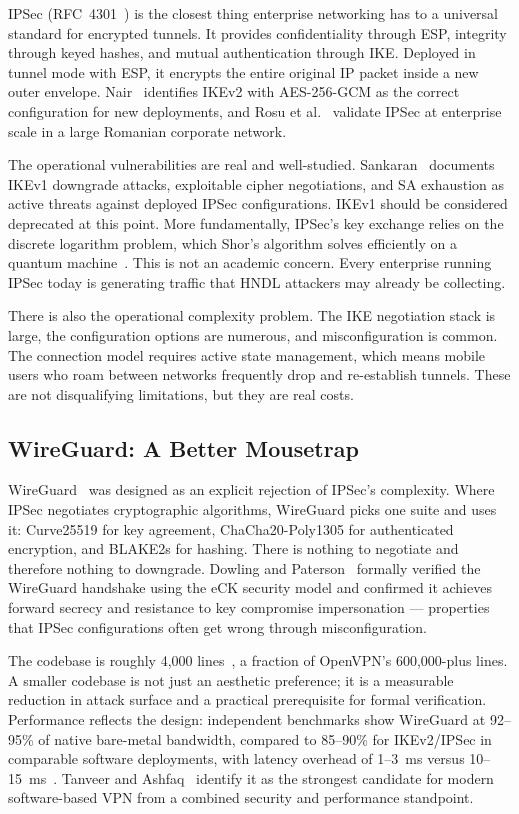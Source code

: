 \documentclass[conference]{IEEEtran}
\begin{document}
IPSec (RFC~4301~\cite{rfc4301}) is the closest thing enterprise
networking has to a universal standard for encrypted tunnels.
It provides confidentiality through ESP, integrity through keyed
hashes, and mutual authentication through IKE. Deployed in
tunnel mode with ESP, it encrypts the entire original IP packet
inside a new outer envelope. Nair~\cite{nair2024} identifies
IKEv2 with AES-256-GCM as the correct configuration for new
deployments, and Rosu et al.~\cite{rosu2012} validate IPSec at
enterprise scale in a large Romanian corporate network.

The operational vulnerabilities are real and well-studied.
Sankaran~\cite{sankaran2023} documents IKEv1 downgrade attacks,
exploitable cipher negotiations, and SA exhaustion as active
threats against deployed IPSec configurations. IKEv1 should be
considered deprecated at this point. More fundamentally, IPSec's
key exchange relies on the discrete logarithm problem, which
Shor's algorithm solves efficiently on a quantum
machine~\cite{nist_fips203}. This is not an academic concern.
Every enterprise running IPSec today is generating traffic that
HNDL attackers may already be collecting.

There is also the operational complexity problem. The IKE
negotiation stack is large, the configuration options are
numerous, and misconfiguration is common. The connection model
requires active state management, which means mobile users who
roam between networks frequently drop and re-establish tunnels.
These are not disqualifying limitations, but they are real costs.

\subsection{WireGuard: A Better Mousetrap}

WireGuard~\cite{donenfeld2017} was designed as an explicit
rejection of IPSec's complexity. Where IPSec negotiates
cryptographic algorithms, WireGuard picks one suite and uses
it: Curve25519 for key agreement, ChaCha20-Poly1305 for
authenticated encryption, and BLAKE2s for hashing. There is
nothing to negotiate and therefore nothing to downgrade.
Dowling and Paterson~\cite{dowling2018} formally verified the
WireGuard handshake using the eCK security model and confirmed
it achieves forward secrecy and resistance to key compromise
impersonation --- properties that IPSec configurations often
get wrong through misconfiguration.

The codebase is roughly 4,000 lines~\cite{calmops2026}, a
fraction of OpenVPN's 600,000-plus lines. A smaller codebase
is not just an aesthetic preference; it is a measurable reduction
in attack surface and a practical prerequisite for formal
verification. Performance reflects the design: independent
benchmarks show WireGuard at 92--95\% of native bare-metal
bandwidth, compared to 85--90\% for IKEv2/IPSec in comparable
software deployments, with latency overhead of 1--3~ms versus
10--15~ms~\cite{zhuque2026,zenarmor2023}. Tanveer and
Ashfaq~\cite{tanveer2023} identify it as the strongest
candidate for modern software-based VPN from a combined security
and performance standpoint.
\end{document}
